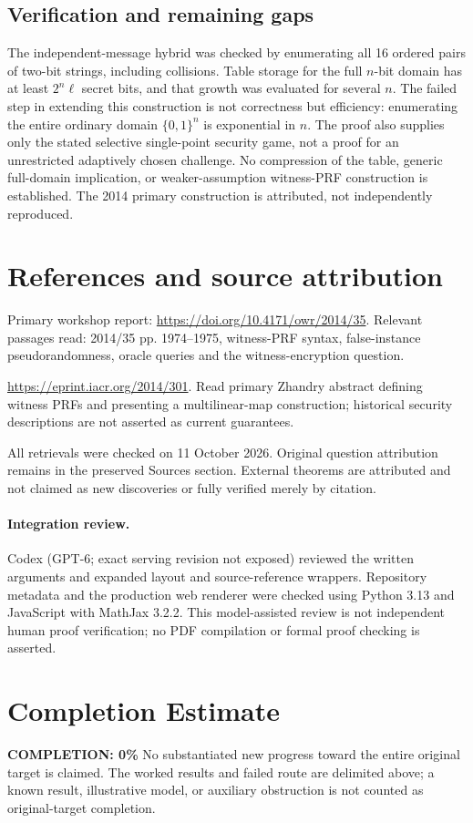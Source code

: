 \documentclass[11pt]{article}
\begin{document}
\subsection{Verification and remaining gaps}
The independent-message hybrid was checked by enumerating all 16 ordered pairs of two-bit strings, including collisions. Table storage for the full $n$-bit domain has at least $2^n\ell$ secret bits, and that growth was evaluated for several $n$. The failed step in extending this construction is not correctness but efficiency: enumerating the entire ordinary domain $\{0,1\}^n$ is exponential in $n$. The proof also supplies only the stated selective single-point security game, not a proof for an unrestricted adaptively chosen challenge. No compression of the table, generic full-domain implication, or weaker-assumption witness-PRF construction is established. The 2014 primary construction is attributed, not independently reproduced.

\section{References and source attribution}
Primary workshop report: \url{https://doi.org/10.4171/owr/2014/35}. Relevant passages read: 2014/35 pp. 1974--1975, witness-PRF syntax, false-instance pseudorandomness, oracle queries and the witness-encryption question.

\url{https://eprint.iacr.org/2014/301}. Read primary Zhandry abstract defining witness PRFs and presenting a multilinear-map construction; historical security descriptions are not asserted as current guarantees.

All retrievals were checked on 11 October 2026. Original question attribution remains in the preserved Sources section. External theorems are attributed and not claimed as new discoveries or fully verified merely by citation.


\paragraph{Integration review.} Codex (GPT-6; exact serving revision not exposed) reviewed the written arguments and expanded layout and source-reference wrappers. Repository metadata and the production web renderer were checked using Python 3.13 and JavaScript with MathJax 3.2.2. This model-assisted review is not independent human proof verification; no PDF compilation or formal proof checking is asserted.

\section{Completion Estimate}
\noindent\textbf{COMPLETION: 0\%}
No substantiated new progress toward the entire original target is claimed. The worked results and failed route are delimited above; a known result, illustrative model, or auxiliary obstruction is not counted as original-target completion.
\end{document}
